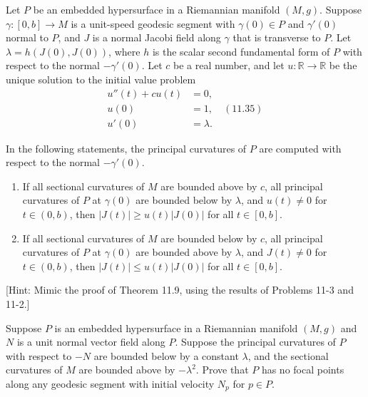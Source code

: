 \begin{exercise}\label{prob:transverse-jacobi-comparison}
Let $P$ be an embedded hypersurface in a Riemannian manifold $(M, g)$. Suppose $\gamma: [0, b] \to M$ is a unit-speed geodesic segment with $\gamma(0) \in P$ and $\gamma'(0)$ normal to $P$, and $J$ is a normal Jacobi field along $\gamma$ that is transverse to $P$. Let $\lambda = h(J(0), J(0))$, where $h$ is the scalar second fundamental form of $P$ with respect to the normal $-\gamma'(0)$. Let $c$ be a real number, and let $u: \mathbb{R} \to \mathbb{R}$ be the unique solution to the initial value problem
\[
\begin{aligned}
u''(t) + cu(t) &= 0, \\
u(0) &= 1, \quad (11.35) \\
u'(0) &= \lambda.
\end{aligned}
\]

In the following statements, the principal curvatures of $P$ are computed with respect to the normal $-\gamma'(0)$.

\begin{enumerate}
\item[(a)] If all sectional curvatures of $M$ are bounded above by $c$, all principal curvatures of $P$ at $\gamma(0)$ are bounded below by $\lambda$, and $u(t) \neq 0$ for $t \in (0, b)$, then $|J(t)| \geq u(t)|J(0)|$ for all $t \in [0, b]$.

\item[(b)] If all sectional curvatures of $M$ are bounded below by $c$, all principal curvatures of $P$ at $\gamma(0)$ are bounded above by $\lambda$, and $J(t) \neq 0$ for $t \in (0, b)$, then $|J(t)| \leq u(t)|J(0)|$ for all $t \in [0, b]$.
\end{enumerate}

[Hint: Mimic the proof of Theorem 11.9, using the results of Problems 11-3 and 11-2.]
\end{exercise}

\begin{exercise}\label{prob:focal-points-hypersurface}
Suppose $P$ is an embedded hypersurface in a Riemannian manifold $(M, g)$ and $N$ is a unit normal vector field along $P$. Suppose the principal curvatures of $P$ with respect to $-N$ are bounded below by a constant $\lambda$, and the sectional curvatures of $M$ are bounded above by $-\lambda^2$. Prove that $P$ has no focal points along any geodesic segment with initial velocity $N_p$ for $p \in P$.
\end{exercise}

